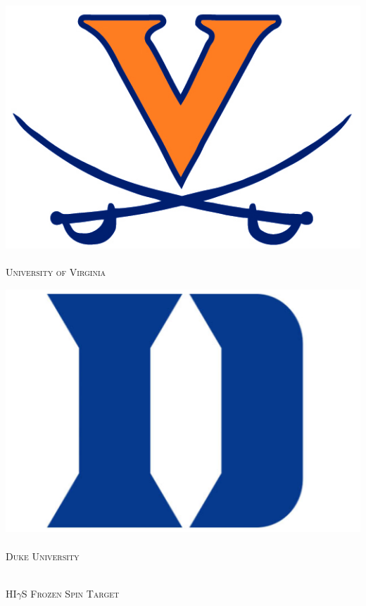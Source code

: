 \begin{titlepage}
\begin{center}

\noindent\begin{minipage}{.4\textwidth}
\centering
\includegraphics[width=\linewidth]{./img/uva-logo.png}~\\[.5cm]
\textsc{\normalsize University of Virginia}\\[1.5cm]
\end{minipage}
\hfill
\noindent\begin{minipage}{.4\textwidth}
\centering
\includegraphics[width=\linewidth]{./img/duke-logo.png}~\\[.5cm]
\textsc{\normalsize Duke University}\\[1.5cm]
\end{minipage}
\\[80pt]
\textsc{\Large HI$\gamma$S Frozen Spin Target}\\[0.5cm]


\end{center}
\end{titlepage}
